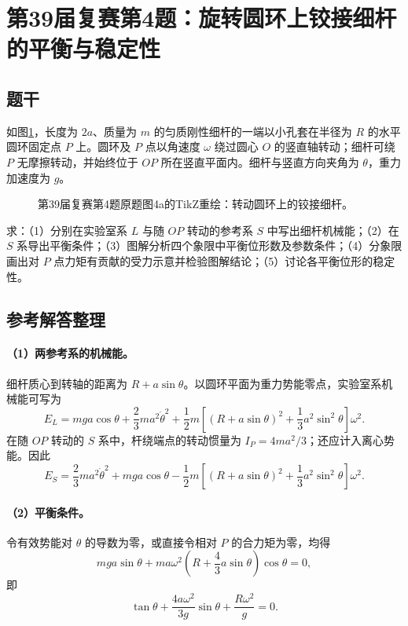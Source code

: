 \section{第39届复赛第4题：旋转圆环上铰接细杆的平衡与稳定性}

\subsection{题干}
如图\ref{fig:cpho39q04structure}，长度为 $2a$、质量为 $m$ 的匀质刚性细杆的一端以小孔套在半径为 $R$ 的水平圆环固定点 $P$ 上。圆环及 $P$ 点以角速度 $\omega$ 绕过圆心 $O$ 的竖直轴转动；细杆可绕 $P$ 无摩擦转动，并始终位于 $OP$ 所在竖直平面内。细杆与竖直方向夹角为 $\theta$，重力加速度为 $g$。

\begin{figure}[htbp]\centering
  
  \caption{第39届复赛第4题原题图4a的TikZ重绘：转动圆环上的铰接细杆。}\label{fig:cpho39q04structure}
\end{figure}

求：（1）分别在实验室系 $L$ 与随 $OP$ 转动的参考系 $S$ 中写出细杆机械能；（2）在 $S$ 系导出平衡条件；（3）图解分析四个象限中平衡位形数及参数条件；（4）分象限画出对 $P$ 点力矩有贡献的受力示意并检验图解结论；（5）讨论各平衡位形的稳定性。

\subsection{参考解答整理}
\paragraph{（1）两参考系的机械能。}
细杆质心到转轴的距离为 $R+a\sin\theta$。以圆环平面为重力势能零点，实验室系机械能可写为
\[
E_L=mga\cos\theta+\frac23ma^2\dot\theta^2
+\frac12m\left[(R+a\sin\theta)^2+\frac13a^2\sin^2\theta\right]\omega^2.
\]
在随 $OP$ 转动的 $S$ 系中，杆绕端点的转动惯量为 $I_P=4ma^2/3$；还应计入离心势能。因此
\[
\boxed{E_S=\frac23ma^2\dot\theta^2+mga\cos\theta
-\frac12m\left[(R+a\sin\theta)^2+\frac13a^2\sin^2\theta\right]\omega^2.}
\]

\paragraph{（2）平衡条件。}
令有效势能对 $\theta$ 的导数为零，或直接令相对 $P$ 的合力矩为零，均得
\[
mga\sin\theta+ma\omega^2\left(R+\frac43a\sin\theta\right)\cos\theta=0,
\]
即
\[
\boxed{\tan\theta+\frac{4a\omega^2}{3g}\sin\theta+\frac{R\omega^2}{g}=0.}
\]

